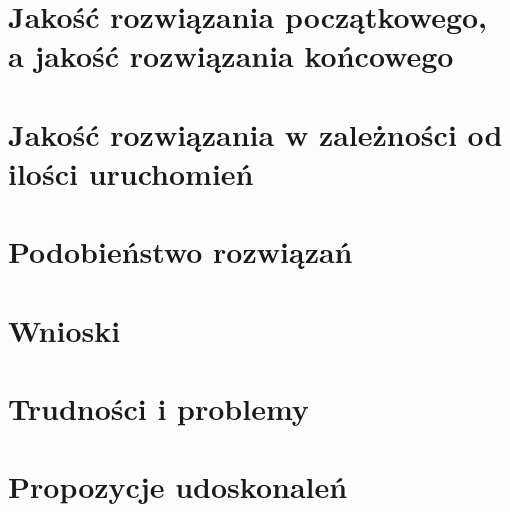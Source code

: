 \documentclass{article}
\begin{document}
\section{Jakość rozwiązania początkowego, a jakość rozwiązania końcowego}
\section{Jakość rozwiązania w zależności od ilości uruchomień}
\section{Podobieństwo rozwiązań}
\section{Wnioski}

\section{Trudności i problemy}

\section{Propozycje udoskonaleń}

\clearpage



\end{document}

